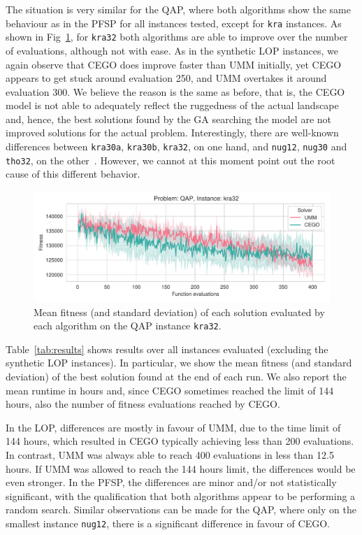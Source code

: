 \documentclass[runningheads]{llncs}
\begin{document}
The situation is very similar for the QAP, where both algorithms show the same
behaviour as in the PFSP for all instances tested, except for
\texttt{kra} instances. As shown in Fig~\ref{fig:kra32}, for \texttt{kra32} both
algorithms are able to improve over the number of evaluations, although not
with ease. As in the synthetic LOP instances, we again observe that CEGO does
improve faster than UMM initially, yet CEGO appears to get stuck around
evaluation 250, and UMM overtakes it around evaluation 300. We believe the
reason is the same as before, that is, the CEGO model is not able to adequately
reflect the ruggedness of the actual landscape and, hence, the best solutions
found by the GA searching the model are not improved solutions for the actual
problem. Interestingly, there are well-known differences between
\texttt{kra30a}, \texttt{kra30b}, \texttt{kra32}, on one hand, and \texttt{nug12}, \texttt{nug30} and
\texttt{tho32}, on the other~\citep{AnsBriGou2002qap}. However, we cannot at
this moment point out the root cause of this different behavior.

\begin{figure}[tp]
  \centering%
  \includegraphics[width=\textwidth]{../img/fitness_real_qap_kra32_dat}
  \caption{Mean fitness  (and standard deviation)  of each solution evaluated by each algorithm on the QAP instance \texttt{kra32}.\label{fig:kra32}}
  \vspace*{-1em}
\end{figure}

Table~\ref{tab:results} shows results over all instances evaluated (excluding
the synthetic LOP instances). In particular, we show the mean fitness (and
standard deviation) of the best solution found at the end of each run. We also report the mean runtime in hours and, since CEGO sometimes reached the limit of 144 hours, also the number of fitness evaluations reached by CEGO.

In the LOP, differences are mostly in favour of UMM, due to the time limit of
144 hours, which resulted in CEGO typically achieving less than 200
evaluations. In contrast, UMM was always able to reach 400 evaluations in less
than 12.5 hours. If UMM was allowed to reach the 144 hours limit, the differences
would be even stronger.
%
In the PFSP, the differences are minor and/or not statistically
significant, with the qualification that both algorithms appear to be
performing a random search. Similar observations can be made for the QAP, where
only on the smallest instance \texttt{nug12}, there is a significant difference
in favour of CEGO.
\end{document}
